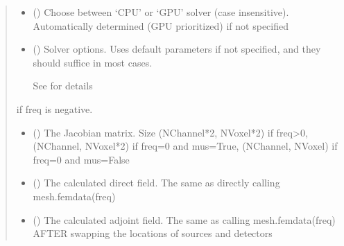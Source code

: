 \documentclass[letterpaper,10pt,english]{sphinxmanual}
\begin{document}
\begin{fulllineitems}
\begin{fulllineitems}
\begin{quote}
\begin{description}
\begin{itemize}
\item {} 
\sphinxAtStartPar
{} (\sphinxstyleliteralemphasis{\sphinxupquote{, }}) \textendash{} Choose between ‘CPU’ or ‘GPU’ solver (case insensitive). Automatically determined (GPU prioritized) if not specified

\item {} 
\sphinxAtStartPar
{} ({\hyperref[\detokenize{_autosummary/nirfasterff.utils.SolverOptions:nirfasterff.utils.SolverOptions}]{}}\sphinxstyleliteralemphasis{\sphinxupquote{, }}) \textendash{} 
\sphinxAtStartPar
Solver options. Uses default parameters if not specified, and they should suffice in most cases.

\sphinxAtStartPar
See {\hyperref[\detokenize{_autosummary/nirfasterff.utils.SolverOptions:nirfasterff.utils.SolverOptions}]{}} for details


\end{itemize}

\sphinxAtStartPar
{} \textendash{} if freq is negative.

\sphinxAtStartPar
\begin{itemize}
\item {} 
\sphinxAtStartPar
{} () \textendash{} The Jacobian matrix. Size (NChannel*2, NVoxel*2) if freq\textgreater{}0, (NChannel, NVoxel*2) if freq=0 and mus=True, (NChannel, NVoxel) if freq=0 and mus=False

\item {} 
\sphinxAtStartPar
{} () \textendash{} The calculated direct field. The same as directly calling mesh.femdata(freq)

\item {} 
\sphinxAtStartPar
{} () \textendash{} The calculated adjoint field. The same as calling mesh.femdata(freq) AFTER swapping the locations of sources and detectors

\end{itemize}



\end{description}
\end{quote}
\end{fulllineitems}
\end{fulllineitems}
\end{document}
